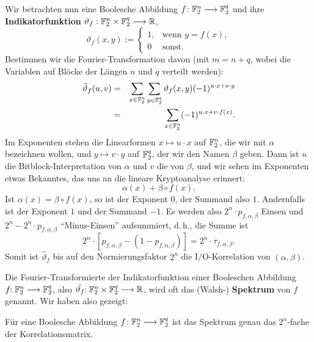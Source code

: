 \begin{refsegment}
Wir betrachten nun eine Boolesche
Abbildung
$f\!: \mathbb{F}_2^n \longrightarrow \mathbb{F}_2^q$ und ihre
{\bf Indikatorfunktion}
$\vartheta_f: \mathbb{F}_2^n \times \mathbb{F}_2^q \longrightarrow \mathbb{R}$,
\[
  \vartheta_f(x,y) := \left\{ \begin{array}{ll}
                     1, & \textrm{wenn } y = f(x), \\
                     0  & \textrm{sonst.}
                   \end{array} \right.
\]
Bestimmen wir die Fourier-Transformation
davon (mit $m = n+q$, wobei die
Variablen auf Blöcke der Längen $n$ und $q$ verteilt werden):
\begin{eqnarray*}
  \hat{\vartheta}_f(u,v) & = & \sum_{x \in \mathbb{F}_2^n} \sum_{y \in \mathbb{F}_2^q}
                            \vartheta_f(x,y) (-1)^{u\cdot x + v\cdot y} \\
    & = & \sum_{x \in \mathbb{F}_2^n} (-1)^{u\cdot x + v\cdot f(x)}.
\end{eqnarray*}
Im Exponenten stehen die Linearformen $x \mapsto u \cdot x$ auf $\mathbb{F}_2^n$,
die wir mit $\alpha$ bezeichnen wollen, und $y \mapsto v \cdot y$ auf $\mathbb{F}_2^q$,
der wir den Namen $\beta$ geben. Dann ist $u$ die Bitblock-Interpretation
von $\alpha$ und $v$ die von $\beta$, und wir sehen im Exponenten etwas Bekanntes,
das uns an die lineare
Kryptoanalyse erinnert:
\[
     \alpha(x) + \beta \circ f(x).
\]
Ist $\alpha(x) = \beta \circ f(x)$, so ist der Exponent $0$, der
Summand also $1$. Andernfalls ist der Exponent $1$ und der Summand $-1$.
Es werden also $2^n \cdot p_{f,\alpha,\beta}$ Einsen und
$2^n - 2^n \cdot p_{f,\alpha,\beta}$ "`Minus-Einsen"' aufsummiert, d.\,h.,
die Summe ist
\[
     2^n \cdot [p_{f,\alpha,\beta} - (1 - p_{f,\alpha,\beta})]
     = 2^n \cdot \tau_{f,\alpha,\beta}.
\]
Somit ist $\hat{\vartheta}_f$ bis auf den Normierungsfaktor $2^n$ die
I/O-Korrelation von $(\alpha, \beta)$.

Die Fourier-Transformierte der Indikatorfunktion
einer Booleschen Abbildung
$f\!\!: \mathbb{F}_2^n \longrightarrow \mathbb{F}_2^q$, also
$\hat{\vartheta_f}\!\!: \mathbb{F}_2^n \times \mathbb{F}_2^q \longrightarrow \mathbb{R}$,
wird oft das (Walsh-) {\bf Spektrum}
von $f$ genannt. Wir haben also gezeigt:

\begin{satz}\label{hwtchar}
  Für eine Boolesche Abbildung $f\!:\mathbb{F}_2^n \longrightarrow \mathbb{F}_2^q$
  ist das Spektrum genau das $2^n$-fache der
  Korrelationsmatrix.
\end{satz}


\end{refsegment}

